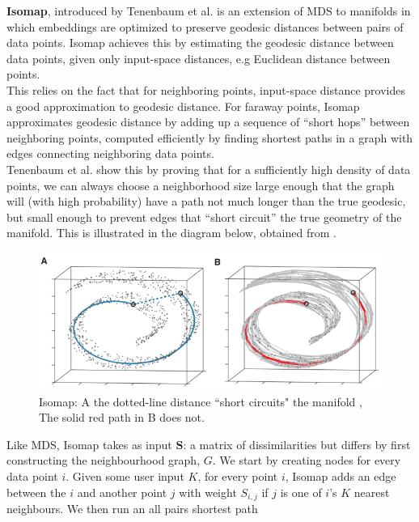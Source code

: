\documentclass[12pt]{report}
\begin{document}
\textbf{Isomap}, introduced by Tenenbaum et al. \cite{isomap} is an extension 
of MDS to manifolds in which embeddings 
are optimized to preserve geodesic distances between pairs of data points.
Isomap achieves this by estimating the geodesic distance between data points, 
given only input-space distances, e.g Euclidean distance between points.
\\
This relies on the fact that for neighboring points, 
input-space distance provides a good approximation to geodesic distance. 
For faraway points, Isomap approximates geodesic distance 
by adding up a sequence of “short hops” between neighboring points, 
computed efficiently by finding shortest paths in a graph with edges 
connecting neighboring data points.\\
Tenenbaum et al. \cite{isomap} show this by proving that for a 
sufficiently high density of data points, 
we can always choose a neighborhood size large enough 
that the graph will (with high probability) have a path not much longer 
than the true geodesic, but small enough to prevent edges 
that ``short circuit” the true geometry of the manifold.
This is illustrated in the diagram below, obtained from \cite{isomap}.\\
\begin{figure}[ht]
    \begin{center}
        \includegraphics[scale=0.85]{isomap.PNG}
        \caption{Isomap: A the dotted-line distance ``short circuits" the manifold
        , The solid red path in B does not.}
        \label{fig:Isomap}
    \end{center}
\end{figure}
Like MDS, Isomap takes as input $\mathbf{S}$: 
a matrix of dissimilarities but differs by first 
constructing the neighbourhood graph, $G$. We start by creating nodes for every 
data point $i$. Given some user input $K$,
for every point $i$, Isomap adds an edge between
the $i$ and another point $j$ with weight $S_{i,j}$ if $j$ is 
one of $i$'s $K$ nearest neighbours. We then run an all pairs shortest path 
\end{document}
